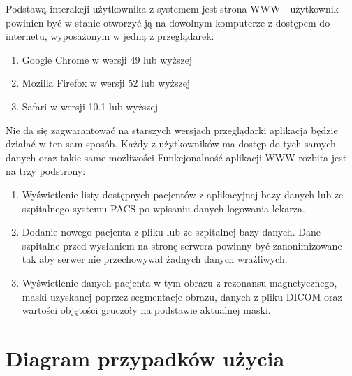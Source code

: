 \documentclass[a4paper,11pt,twoside]{report}
\theoremstyle{definition}
\begin{document}
Podstawą interakcji użytkownika z systemem jest strona WWW - użytkownik powinien być w stanie otworzyć ją na dowolnym komputerze z dostępem do internetu, wyposażonym w jedną z przeglądarek:
\begin {enumerate}
\item Google Chrome w wersji 49 lub wyższej
\item Mozilla Firefox w wersji 52 lub wyższej
\item Safari w wersji 10.1 lub wyższej
\end {enumerate}
Nie da się zagwarantować na starszych wersjach przeglądarki aplikacja będzie działać w ten sam sposób. Każdy z użytkowników ma dostęp do tych samych danych oraz takie same możliwości
Funkcjonalność aplikacji WWW rozbita jest na trzy podstrony:
\begin {enumerate}
\item Wyświetlenie listy dostępnych pacjentów z aplikacyjnej bazy danych lub ze szpitalnego systemu PACS po wpisaniu danych logowania lekarza.
\item Dodanie nowego pacjenta z pliku lub ze szpitalnej bazy danych. Dane szpitalne przed wysłaniem na stronę serwera powinny być zanonimizowane tak aby serwer nie przechowywał żadnych danych wrażliwych.
\item Wyświetlenie danych pacjenta w tym obrazu z rezonansu magnetycznego, maski uzyskanej poprzez segmentacje obrazu, danych z pliku DICOM oraz wartości objętości gruczoły na podstawie aktualnej maski.
\end {enumerate}

\section{Diagram przypadków użycia}
\end{document}
